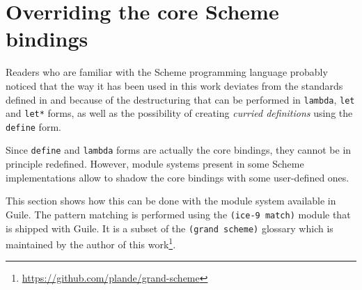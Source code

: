 \chapter{Overriding the core Scheme bindings}

Readers who are familiar with the Scheme programming language
probably noticed that the way it has been used in this work
deviates from the standards defined in \cite{R5RS} and \cite{R6RS}
because of the destructuring that can be performed in \texttt{lambda},
\texttt{let} and \texttt{let*} forms, as well as the possibility
of creating \textit{curried definitions} using the \texttt{define} form.

Since \texttt{define} and \texttt{lambda} forms are actually the core
bindings, they cannot be in principle redefined. However, module systems
present in some Scheme implementations allow to shadow the core bindings
with some user-defined ones.

This section shows how this can be done with the module system
available in Guile. The pattern matching is performed using the
\texttt{(ice-9 match)} module that is shipped with Guile. It is
a subset of the \texttt{(grand scheme)} glossary which is maintained
by the author of this work\footnote{\url{https://github.com/plande/grand-scheme}}.

